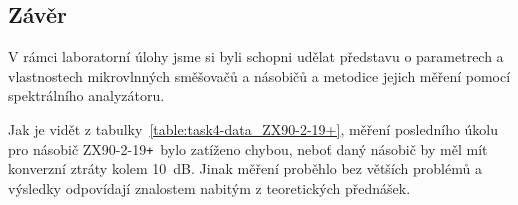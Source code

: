 \documentclass[11pt,a4paper]{article}
\newcommand{\plus}{{\texttt{+}}}
\begin{document}
\subsection*{Závěr}
V rámci laboratorní úlohy jsme si byli schopni udělat představu o parametrech a vlastnostech mikrovlnných směšovačů a násobičů a metodice jejich měření pomocí spektrálního analyzátoru.

Jak je vidět z tabulky~\ref{table:task4-data_ZX90-2-19+}, měření posledního úkolu pro násobič ZX90-2-19\plus~bylo zatíženo chybou, neboť daný násobič by měl mít konverzní ztráty kolem 10~dB. Jinak měření proběhlo bez větších problémů a výsledky odpovídají znalostem nabitým z teoretických přednášek.
\end{document}
